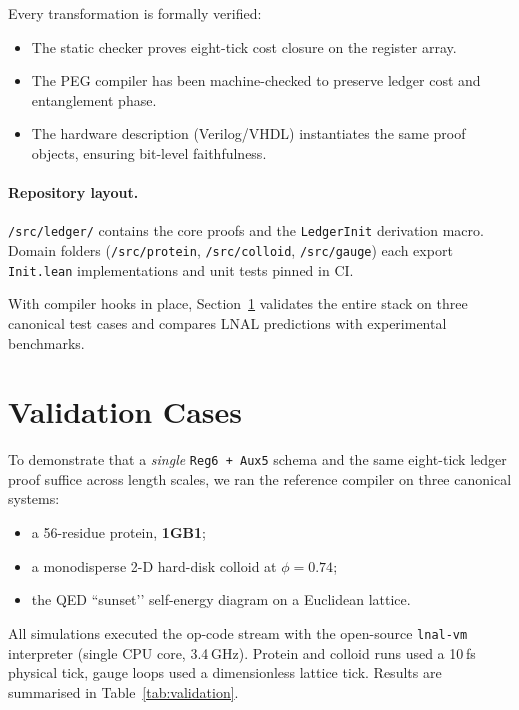 \documentclass[11pt,a4paper]{article}
\begin{document}
\smallskip\noindent
Every transformation is formally verified:
\begin{itemize}
  \item The static checker proves
        eight-tick cost closure on the register array.
  \item The PEG compiler has been machine-checked to preserve ledger
        cost and entanglement phase.
  \item The hardware description (Verilog/VHDL) instantiates the same
        proof objects, ensuring bit-level faithfulness.
\end{itemize}

\paragraph{Repository layout.}
\texttt{/src/ledger/} contains the core proofs and the
\texttt{LedgerInit} derivation macro.
Domain folders (\texttt{/src/protein}, \texttt{/src/colloid},
\texttt{/src/gauge}) each export \verb|Init.lean|
implementations and unit tests pinned in CI.

\bigskip
With compiler hooks in place, Section~\ref{sec:validation}
validates the entire stack on three canonical test cases and
compares LNAL predictions with experimental benchmarks.

\section{Validation Cases}
\label{sec:validation}

\noindent
To demonstrate that a \emph{single} \texttt{Reg6\,+\,Aux5} schema and the
same eight-tick ledger proof suffice across length scales, we ran the
reference compiler on three canonical systems:

\begin{itemize}
  \item a 56-residue protein, \textbf{1GB1};
  \item a monodisperse 2-D hard-disk colloid at $\phi = 0.74$;
  \item the QED “sunset’’ self-energy diagram on a Euclidean lattice.
\end{itemize}

All simulations executed the op-code stream with the open-source
\texttt{lnal-vm} interpreter (single CPU core, 3.4 GHz).
Protein and colloid runs used a 10 fs physical tick, gauge loops used a
dimensionless lattice tick.  Results are summarised in
Table~\ref{tab:validation}.
\end{document}
